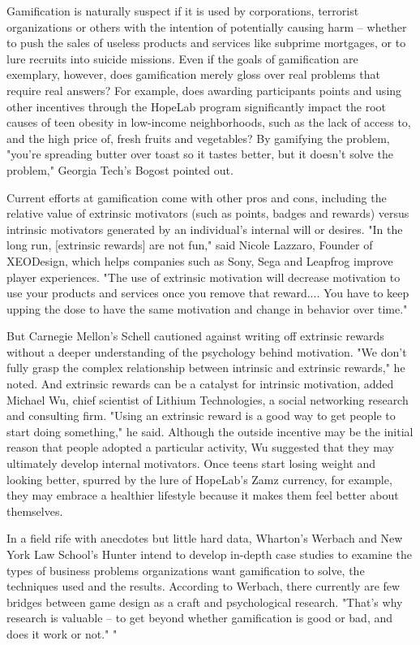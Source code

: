 Gamification is naturally suspect if it is used by corporations, terrorist organizations or others with the intention of potentially causing harm -- whether to push the sales of useless products and services like subprime mortgages, or to lure recruits into suicide missions. Even if the goals of gamification are exemplary, however, does gamification merely gloss over real problems that require real answers? For example, does awarding participants points and using other incentives through the HopeLab program significantly impact the root causes of teen obesity in low-income neighborhoods, such as the lack of access to, and the high price of, fresh fruits and vegetables? By gamifying the problem, "you're spreading butter over toast so it tastes better, but it doesn't solve the problem," Georgia Tech's Bogost pointed out.

Current efforts at gamification come with other pros and cons, including the relative value of extrinsic motivators (such as points, badges and rewards) versus intrinsic motivators generated by an individual's internal will or desires. "In the long run, [extrinsic rewards] are not fun," said Nicole Lazzaro, Founder of XEODesign, which helps companies such as Sony, Sega and Leapfrog improve player experiences. "The use of extrinsic motivation will decrease motivation to use your products and services once you remove that reward.... You have to keep upping the dose to have the same motivation and change in behavior over time."

But Carnegie Mellon's Schell cautioned against writing off extrinsic rewards without a deeper understanding of the psychology behind motivation. "We don't fully grasp the complex relationship between intrinsic and extrinsic rewards," he noted. And extrinsic rewards can be a catalyst for intrinsic motivation, added Michael Wu, chief scientist of Lithium Technologies, a social networking research and consulting firm. "Using an extrinsic reward is a good way to get people to start doing something," he said. Although the outside incentive may be the initial reason that people adopted a particular activity, Wu suggested that they may ultimately develop internal motivators. Once teens start losing weight and looking better, spurred by the lure of HopeLab's Zamz currency, for example, they may embrace a healthier lifestyle because it makes them feel better about themselves.

In a field rife with anecdotes but little hard data, Wharton's Werbach and New York Law School's Hunter intend to develop in-depth case studies to examine the types of business problems organizations want gamification to solve, the techniques used and the results. According to Werbach, there currently are few bridges between game design as a craft and psychological research. "That's why research is valuable -- to get beyond whether gamification is good or bad, and does it work or not."
"

